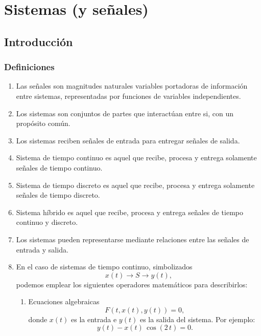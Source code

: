 \chapter{Sistemas (y señales)}

\section{Introducción}

\subsection{Definiciones}

\begin{enumerate}
	\item Las señales son magnitudes naturales variables portadoras de información entre sistemas, representadas por funciones de variables independientes.
	\item Los sistemas son conjuntos de partes que interactúan entre si, con un propósito común.
	\item Los sistemas reciben señales de entrada para entregar señales de salida.
	\item Sistema de tiempo continuo es aquel que recibe, procesa y entrega solamente señales de tiempo continuo.
	\item Sistema de tiempo discreto es aquel que recibe, procesa y entrega solamente señales de tiempo discreto.
	\item Sistema híbrido es aquel que recibe, procesa y entrega señales de tiempo continuo y discreto.
	\item Los sistemas pueden representarse mediante relaciones entre las señales de entrada y salida.
	\item En el caso de sistemas de tiempo continuo, simbolizados
	\begin{equation}
		x(t) \rightarrow S \rightarrow y(t),
	\end{equation}
	podemos emplear los siguientes operadores matemáticos para describirlos:
	\begin{enumerate}
		\item Ecuaciones algebraicas
		\begin{equation}
			F(t, x(t), y(t)) = 0,
		\end{equation}
		donde $x(t)$ es la entrada e $y(t)$ es la salida del sistema. Por ejemplo:
		\begin{equation}
			y(t) - x(t) \, \cos(2 \, t) = 0.
		\end{equation}
		

\end{enumerate}
\end{enumerate}
